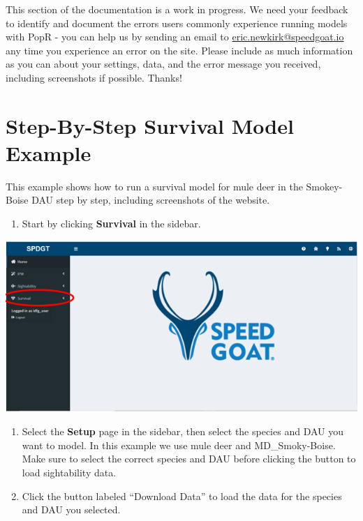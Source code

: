 \documentclass[
]{book}
\providecommand{\tightlist}{%
  \setlength{\itemsep}{0pt}\setlength{\parskip}{0pt}}
\begin{document}
This section of the documentation is a work in progress. We need your feedback to identify and document the errors users commonly experience running models with PopR - you can help us by sending an email to \href{mailto:eric.newkirk@speedgoat.io?cc=josh.nowak@speedgoat.io\&subject=PopR\%20Error}{eric.newkirk@speedgoat.io} any time you experience an error on the site. Please include as much information as you can about your settings, data, and the error message you received, including screenshots if possible. Thanks!

\hypertarget{surv-ex}{%
\section{Step-By-Step Survival Model Example}\label{surv-ex}}

This example shows how to run a survival model for mule deer in the Smokey-Boise DAU step by step, including screenshots of the website.

\begin{enumerate}
\def\labelenumi{\arabic{enumi}.}
\tightlist
\item
  Start by clicking \textbf{Survival} in the sidebar.
\end{enumerate}

\includegraphics{./www/surv_01.PNG}

\begin{enumerate}
\def\labelenumi{\arabic{enumi}.}
\setcounter{enumi}{1}
\item
  Select the \textbf{Setup} page in the sidebar, then select the species and DAU you want to model. In this example we use mule deer and MD\_Smoky-Boise. Make sure to select the correct species and DAU before clicking the button to load sightability data.
\item
  Click the button labeled ``Download Data'' to load the data for the species and DAU you selected.
\end{enumerate}
\end{document}
